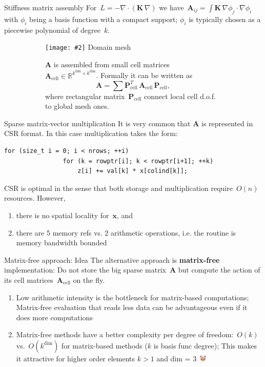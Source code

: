 \documentclass[svgnames]{beamer} %
\newcommand{\includegraphicsw}[2][1.]{\texttt{[image: \#2]}}
\newcommand{\vect}[1]{\boldsymbol{\mathbf{#1}}}
\begin{document}
	\begin{frame}{Stiffness matrix assembly}
		For~$L = -\nabla\cdot(\vect K\,\nabla)$ we have~$\vect A_{ij} = \int \vect K\,\nabla\phi_j\cdot\nabla\phi_i$ with $\phi_i$ being a basis function with a compact support; $\phi_i$ is typically chosen as a piecewise polynomial of degree~$k$.
		\begin{figure}
			\begin{subfigure}{.45\linewidth}
				\centering
				\includegraphicsw[.8]{mesh.png}
				Domain mesh
			\end{subfigure}%
			\begin{subfigure}{.55\linewidth}
				$\vect A$ is assembled from small cell matrices~$\vect A_\text{cell} \in \mathbb R^{k^{\text{dim}}\times k^{\text{dim}}}$. Formally it can be written as
				$$
					\vect A = \sum \vect P^T_\text{cell}\,\vect A_\text{cell}\,\vect P_\text{cell},
				$$
				where rectangular matrix~$\vect P_\text{cell}$ connect local cell d.o.f. to global mesh ones.
			\end{subfigure}
		\end{figure}
	\end{frame}	

	\begin{frame}[fragile]{Sparse matrix-vector multiplication}
		It is very common that $\vect A$ is represented in CSR format. In this case multiplication takes the form:
		\begin{lstlisting}[basicstyle=\small]
			for (size_t i = 0; i < nrows; ++i) 
				for (k = rowptr[i]; k < rowptr[i+1]; ++k)
					z[i] += val[k] * x[colind[k]];
		\end{lstlisting}
		CSR is optimal in the sense that both storage and multiplication require~$O(n)$ resources. However,
		\begin{enumerate}
			\item there is no spatial locality for~$\vect x$, and
			\item there are 5 memory refs vs. 2 arithmetic operations, i.e. the routine is memory bandwidth bounded
		\end{enumerate}
	\end{frame}	
	
	\begin{frame}{Matrix-free approach: Idea}
	The alternative approach is \textbf{matrix-free} implementation: Do not store the big sparse matrix~$\vect A$ but compute the action of its cell matrices~$\vect A_\text{cell}$ on the fly.
		\begin{enumerate}
			\item Low arithmetic intensity is the bottleneck for matrix-based computations; Matrix-free evaluation that reads less data can be advantageous even if it does more computations
			\item Matrix-free methods have a better complexity per degree of freedom:~$O(k)$ vs.~$O(k^\text{dim})$ for matrix-based methods ($k$ is basis func degree); This makes it attractive for higher order elements $k > 1$ and dim = 3~\includegraphics[width=12px]{clown.png}
		\end{enumerate}
	\end{frame}	
	
\end{document}
